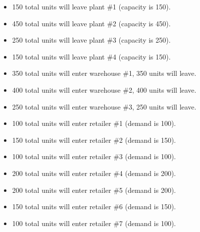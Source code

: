 \documentclass[../report/main.tex]{subfiles}
\begin{document}
\begin{itemize}
	\item 150 total units will leave plant \#1 (capacity is 150).
	\item 450 total units will leave plant \#2 (capacity is 450).
	\item 250 total units will leave plant \#3 (capacity is 250).
	\item 150 total units will leave plant \#4 (capacity is 150).
	\newline
	\item 350 total units will enter warehouse \#1, 350 units will leave.
	\item 400 total units will enter warehouse \#2, 400 units will leave.
	\item 250 total units will enter warehouse \#3, 250 units will leave.
	\newline
	\item 100 total units will enter retailer \#1 (demand is 100).
	\item 150 total units will enter retailer \#2 (demand is 150).
	\item 100 total units will enter retailer \#3 (demand is 100).
	\item 200 total units will enter retailer \#4 (demand is 200).
	\item 200 total units will enter retailer \#5 (demand is 200).
	\item 150 total units will enter retailer \#6 (demand is 150).
	\item 100 total units will enter retailer \#7 (demand is 100).
\end{itemize}
\end{document}

